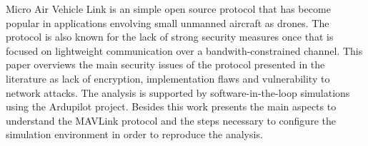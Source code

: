 Micro Air Vehicle Link is an simple open source protocol that has become popular in applications envolving small unmanned aircraft as drones. The protocol is also known for the lack of strong security measures once that is focused on lightweight communication over a bandwith-constrained channel. This paper overviews the main security issues of the protocol presented in the literature as lack of encryption, implementation flaws and vulnerability to network attacks.
The analysis is supported by software-in-the-loop simulations using the Ardupilot project. Besides this work presents the main aspects to understand the MAVLink protocol and the steps necessary to configure the simulation environment in order to reproduce the analysis. 